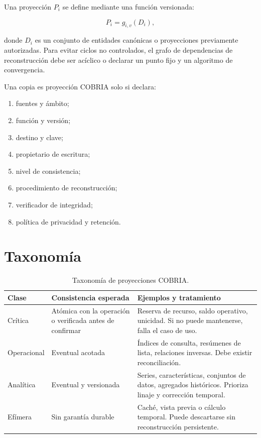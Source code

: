 Una proyección $P_i$ se define mediante una función versionada:

\begin{equation}
P_i=g_{i,v}(D_i),
\label{eq:projection}
\end{equation}

donde $D_i$ es un conjunto de entidades canónicas o proyecciones previamente
autorizadas. Para evitar ciclos no controlados, el grafo de dependencias de
reconstrucción debe ser acíclico o declarar un punto fijo y un algoritmo de convergencia.

Una copia es proyección COBRIA solo si declara:

\begin{enumerate}[leftmargin=*]
  \item fuentes y ámbito;
  \item función y versión;
  \item destino y clave;
  \item propietario de escritura;
  \item nivel de consistencia;
  \item procedimiento de reconstrucción;
  \item verificador de integridad;
  \item política de privacidad y retención.
\end{enumerate}

\section{Taxonomía}

\begin{table}[H]
\centering
\caption{Taxonomía de proyecciones COBRIA.}
\label{tab:taxonomia-proyecciones}
\begin{tabularx}{\textwidth}{p{2.5cm}p{3.3cm}X}
\toprule
Clase & Consistencia esperada & Ejemplos y tratamiento \\
\midrule
Crítica & Atómica con la operación o verificada antes de confirmar & Reserva de recurso,
saldo operativo, unicidad. Si no puede mantenerse, falla el caso de uso.\\
Operacional & Eventual acotada & Índices de consulta, resúmenes de lista, relaciones
inversas. Debe existir reconciliación.\\
Analítica & Eventual y versionada & Series, características, conjuntos de datos, agregados históricos.
Prioriza linaje y corrección temporal.\\
Efímera & Sin garantía durable & Caché, vista previa o cálculo temporal. Puede descartarse sin
reconstrucción persistente.\\
\bottomrule
\end{tabularx}
\end{table}

